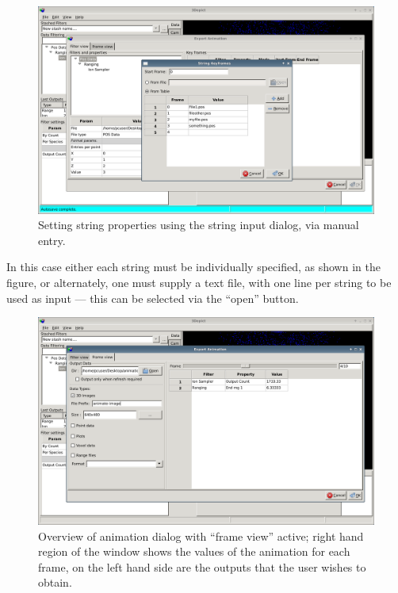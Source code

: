 \documentclass[10pt]{article}
\begin{document}
\begin{figure}
 \begin{center}
 \includegraphics[width=0.9 \textwidth,keepaspectratio=true]{./figures/exportanimDialogPropString.png}
 \caption{Setting string properties using the string input dialog, via manual entry.}
\label{fig:animatePropString}
\centering
\end{center}
\end{figure}




In this case either each string must be individually specified, as shown in the figure, or alternately, one must supply a text file, with one line per string to be used as input --- this can be selected via the ``open'' button.

\begin{figure}
\begin{center}
 \includegraphics[width=0.9 \textwidth,keepaspectratio=true]{./figures/exportanimDialogFrameView.png}
 \caption{Overview of animation dialog with ``frame view'' active; right hand region of the window shows the values of the animation for each frame, on the left hand side are the outputs that the user wishes to obtain.}
\label{fig:animateFrameView}
\end{center}
\end{figure}
\end{document}
